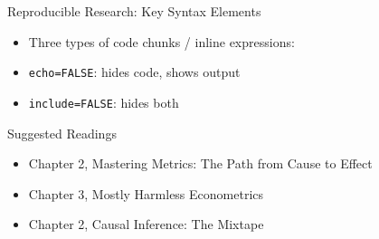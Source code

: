 \documentclass[dvipsnames,hyperref={pdfpagelabels=false}]{beamer}
\begin{document}
\begin{frame}[fragile]{Reproducible Research: Key Syntax Elements}

	\begin{itemize}
		\item Three types of code chunks / inline expressions:
	\end{itemize}

	\vspace{0.2cm}


	\vspace{0.3cm}

	\begin{itemize}
		\item \texttt{echo=FALSE}: hides code, shows output 
        		\vspace{0.2cm}
        \item \texttt{include=FALSE}: hides both
	\end{itemize}

\end{frame}


\begin{frame}{Suggested Readings}
	\begin{itemize} 
		\item Chapter 2, Mastering Metrics: The Path from Cause to Effect
		\vspace{0.2cm}
		\item Chapter 3, Mostly Harmless Econometrics
		\vspace{0.2cm}
		\item Chapter 2, Causal Inference: The Mixtape
	\end{itemize}
\end{frame}
\end{document}
